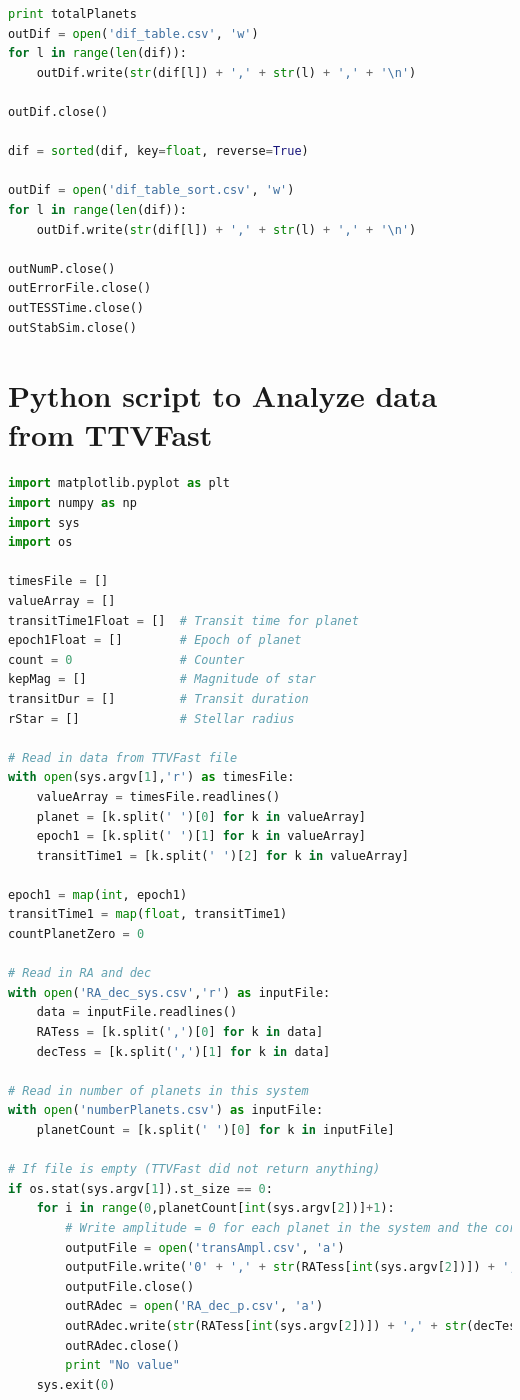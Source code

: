 \documentclass[12pt]{report}
\begin{document}
\begin{appendix}
\begin{lstlisting}[language=Python]
print totalPlanets			
outDif = open('dif_table.csv', 'w')
for l in range(len(dif)):
	outDif.write(str(dif[l]) + ',' + str(l) + ',' + '\n')
	
outDif.close()	
		
dif = sorted(dif, key=float, reverse=True)

outDif = open('dif_table_sort.csv', 'w')
for l in range(len(dif)):
	outDif.write(str(dif[l]) + ',' + str(l) + ',' + '\n')
	
outNumP.close()
outErrorFile.close()
outTESSTime.close()
outStabSim.close()
\end{lstlisting}
\chapter{Python script to Analyze data from TTVFast}
\begin{lstlisting}[language=Python]
import matplotlib.pyplot as plt
import numpy as np
import sys
import os

timesFile = []			
valueArray = []			 
transitTime1Float = []	# Transit time for planet
epoch1Float = []		# Epoch of planet
count = 0				# Counter
kepMag = []				# Magnitude of star
transitDur = []			# Transit duration
rStar = []				# Stellar radius

# Read in data from TTVFast file
with open(sys.argv[1],'r') as timesFile:
	valueArray = timesFile.readlines()
	planet = [k.split(' ')[0] for k in valueArray]
	epoch1 = [k.split(' ')[1] for k in valueArray]
	transitTime1 = [k.split(' ')[2] for k in valueArray]

epoch1 = map(int, epoch1)
transitTime1 = map(float, transitTime1)
countPlanetZero = 0

# Read in RA and dec
with open('RA_dec_sys.csv','r') as inputFile: 
	data = inputFile.readlines()
	RATess = [k.split(',')[0] for k in data]
	decTess = [k.split(',')[1] for k in data]	

# Read in number of planets in this system
with open('numberPlanets.csv') as inputFile:
	planetCount = [k.split(' ')[0] for k in inputFile]

# If file is empty (TTVFast did not return anything)
if os.stat(sys.argv[1]).st_size == 0:
	for i in range(0,planetCount[int(sys.argv[2])]+1):
		# Write amplitude = 0 for each planet in the system and the corresponding RA and dec and exit the script
		outputFile = open('transAmpl.csv', 'a')
		outputFile.write('0' + ',' + str(RATess[int(sys.argv[2])]) + ',' + str(decTess[int(sys.argv[2])]))
		outputFile.close()
		outRAdec = open('RA_dec_p.csv', 'a')
		outRAdec.write(str(RATess[int(sys.argv[2])]) + ',' + str(decTess[int(sys.argv[2])]))
		outRAdec.close()
		print "No value"
	sys.exit(0)
		


\end{lstlisting}
\end{appendix}
\end{document}
